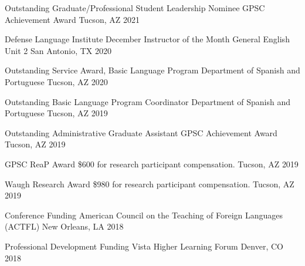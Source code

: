 \begin{cvhonors}


\cvhonor
{Outstanding Graduate/Professional Student Leadership Nominee} %
{GPSC Achievement Award} %
{Tucson, AZ} %
{2021} %


\cvhonor
{Defense Language Institute December Instructor of the Month} %
{General English Unit 2} %
{San Antonio, TX} %
{2020} %


\cvhonor
{Outstanding Service Award, Basic Language Program} %
{Department of Spanish and Portuguese} %
{Tucson, AZ} %
{2020} %


\cvhonor
{Outstanding Basic Language Program Coordinator} %
{Department of Spanish and Portuguese} %
{Tucson, AZ} %
{2019} %

\cvhonor
{Outstanding Administrative Graduate Assistant} %
{GPSC Achievement Award} %
{Tucson, AZ} %
{2019} %


\cvhonor
{GPSC ReaP Award} %
{\$600 for research participant compensation.} %
{Tucson, AZ} %
{2019} %


\cvhonor
{Waugh Research Award} %
{\$980 for research participant compensation.} %
{Tucson, AZ} %
{2019} %


\cvhonor
{Conference Funding} %
{American Council on the Teaching of Foreign Languages (ACTFL) } %
{New Orleans, LA} %
{2018} %


\cvhonor
{Professional Development Funding} %
{Vista Higher Learning Forum } %
{Denver, CO} %
{2018} %



\end{cvhonors}
